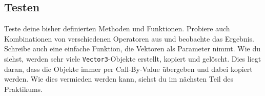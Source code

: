 \subsection{Testen}
Teste deine bisher definierten Methoden und Funktionen.
Probiere auch Kombinationen von verschiedenen Operatoren aus und beobachte das Ergebnis.
Schreibe auch eine einfache Funktion, die Vektoren als Parameter nimmt.
Wie du siehst, werden sehr viele \lstinline{Vector3}-Objekte erstellt, kopiert und gelöscht.
Dies liegt daran, dass die Objekte immer per Call-By-Value übergeben und dabei kopiert werden.
Wie dies vermieden werden kann, siehst du im nächsten Teil des Praktikums.
